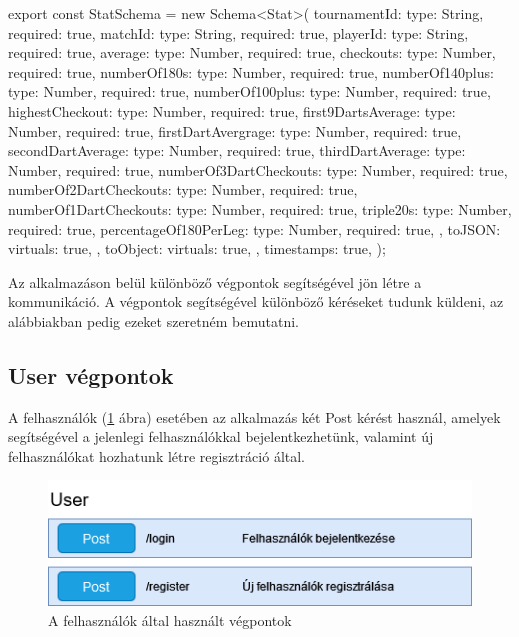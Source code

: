 \begin{cpp}
export const StatSchema = new Schema<Stat>(
  {
    tournamentId: {type: String, required: true},
    matchId: {type: String, required: true},
    playerId: {type: String, required: true},
    average: {type: Number, required: true},
    checkouts: {type: Number, required: true},
    numberOf180s: {type: Number, required: true},
    numberOf140plus: {type: Number, required: true},
    numberOf100plus: {type: Number, required: true},
    highestCheckout: {type: Number, required: true},
    first9DartsAverage: {type: Number, required: true},
    firstDartAvergrage: {type: Number, required: true},
    secondDartAverage: {type: Number, required: true},
    thirdDartAverage: {type: Number, required: true},
    numberOf3DartCheckouts: {type: Number, required: true},
    numberOf2DartCheckouts: {type: Number, required: true},
    numberOf1DartCheckouts: {type: Number, required: true},
    triple20s: {type: Number, required: true},
    percentageOf180PerLeg: {type: Number, required: true},
  },
  {
    toJSON: {
      virtuals: true,
    },
    toObject: {
      virtuals: true,
    },
    timestamps: true,
  }
);
\end{cpp}

Az alkalmazáson belül különböző végpontok segítségével jön létre a kommunikáció. A végpontok segítségével különböző kéréseket tudunk küldeni, az alábbiakban pedig ezeket szeretném bemutatni.
\subsection{User végpontok}
A felhasználók (\ref{fig:userEndpoint} ábra) esetében az alkalmazás két Post kérést használ, amelyek segítségével a jelenlegi felhasználókkal bejelentkezhetünk, valamint új felhasználókat hozhatunk létre regisztráció által.

\begin{figure}[h]
\centering
\includegraphics[scale=0.7]{images/User_Vegpontok.drawio.png}
\caption{A felhasználók által használt végpontok}
\label{fig:userEndpoint}
\end{figure}


